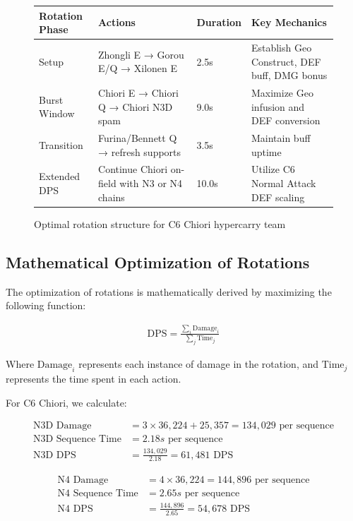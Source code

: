 \documentclass[12pt,a4paper]{article}
\begin{document}
\begin{figure}[H]
\centering
\begin{tabularx}{\textwidth}{|X|X|X|X|}
\hline
\textbf{Rotation Phase} & \textbf{Actions} & \textbf{Duration} & \textbf{Key Mechanics} \\
\hline
Setup & Zhongli E → Gorou E/Q → Xilonen E & 2.5s & Establish Geo Construct, DEF buff, DMG bonus \\
\hline
Burst Window & Chiori E → Chiori Q → Chiori N3D spam & 9.0s & Maximize Geo infusion and DEF conversion \\
\hline
Transition & Furina/Bennett Q → refresh supports & 3.5s & Maintain buff uptime \\
\hline
Extended DPS & Continue Chiori on-field with N3 or N4 chains & 10.0s & Utilize C6 Normal Attack DEF scaling \\
\hline
\end{tabularx}
\caption{Optimal rotation structure for C6 Chiori hypercarry team}
\label{tab:rotation}
\end{figure}

\subsection{Mathematical Optimization of Rotations}

The optimization of rotations is mathematically derived by maximizing the following function:

\begin{align}
\text{DPS} = \frac{\sum_{i} \text{Damage}_i}{\sum_{j} \text{Time}_j}
\end{align}

Where $\text{Damage}_i$ represents each instance of damage in the rotation, and $\text{Time}_j$ represents the time spent in each action.

For C6 Chiori, we calculate:

\begin{align}
\text{N3D Damage} &= 3 \times 36,224 + 25,357 = 134,029 \text{ per sequence} \\
\text{N3D Sequence Time} &= 2.18s \text{ per sequence} \\
\text{N3D DPS} &= \frac{134,029}{2.18} = 61,481 \text{ DPS}
\end{align}

\begin{align}
\text{N4 Damage} &= 4 \times 36,224 = 144,896 \text{ per sequence} \\
\text{N4 Sequence Time} &= 2.65s \text{ per sequence} \\
\text{N4 DPS} &= \frac{144,896}{2.65} = 54,678 \text{ DPS}
\end{align}
\end{document}

